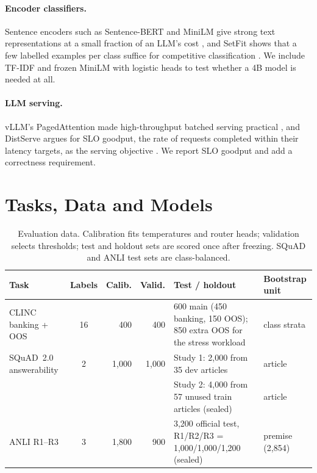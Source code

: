 \documentclass[11pt]{article}
\begin{document}
\paragraph{Encoder classifiers.}
Sentence encoders such as Sentence-BERT and MiniLM give strong text representations at a small fraction of an LLM's cost \citep{reimers-gurevych-2019-sentence,wang2020minilm}, and SetFit shows that a few labelled examples per class suffice for competitive classification \citep{tunstall2022setfit}. We include TF-IDF and frozen MiniLM with logistic heads to test whether a 4B model is needed at all.

\paragraph{LLM serving.}
vLLM's PagedAttention made high-throughput batched serving practical \citep{kwon2023vllm}, and DistServe argues for SLO goodput, the rate of requests completed within their latency targets, as the serving objective \citep{zhong2024distserve}. We report SLO goodput and add a correctness requirement.

\section{Tasks, Data and Models}

\begin{table}[t]
\centering
\small
\begin{tabular}{lcrrp{}l}
\toprule
Task & Labels & Calib. & Valid. & Test / holdout & Bootstrap unit \\
\midrule
CLINC banking + OOS & 16 & 400 & 400 & 600 main (450 banking, 150 OOS); 850 extra OOS for the stress workload & class strata \\
SQuAD~2.0 answerability & 2 & 1,000 & 1,000 & Study 1: 2,000 from 35 dev articles & article \\
 & & & & Study 2: 4,000 from 57 unused train articles (sealed) & article \\
ANLI R1--R3 & 3 & 1,800 & 900 & 3,200 official test, R1/R2/R3 = 1,000/1,000/1,200 (sealed) & premise (2,854) \\
\bottomrule
\end{tabular}
\caption{Evaluation data. Calibration fits temperatures and router heads; validation selects thresholds; test and holdout sets are scored once after freezing. SQuAD and ANLI test sets are class-balanced.}
\label{tab:data}
\end{table}
\end{document}
